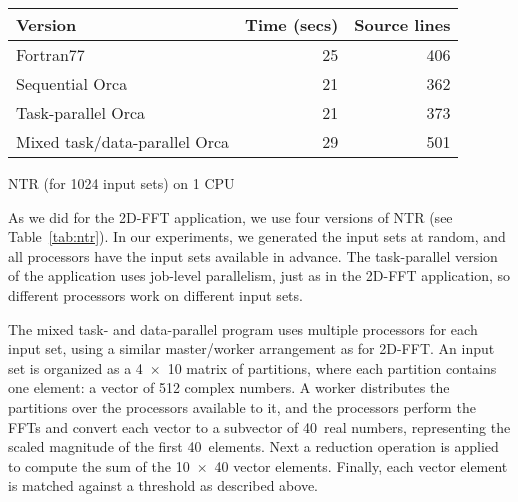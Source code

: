 \documentclass{acmtrans2e}
\begin{document}

\begin{acmtable}{10cm}
\centering
\begin{tabular*}{10cm}{@{\extracolsep\fill}l|r r}
{\bf Version} & {\bf Time (secs)} & {\bf Source lines} \\
\hline
Fortran77 & 25 & 406 \\
Sequential Orca & 21 & 362 \\
Task-parallel Orca & 21 & 373 \\
Mixed task/data-parallel Orca & 29 & 501 \\
\end{tabular*}
\caption{NTR (for 1024 input sets) on 1 CPU}
\label{tab:ntr}
\end{acmtable}

As we did for the 2D-FFT application, we use four versions of NTR (see
Table~\ref{tab:ntr}).
In our experiments, we generated the input sets at random, and
all processors have the input sets available in advance.
The task-parallel version of the application uses job-level parallelism,
just as in the 2D-FFT application, so different processors work
on different input sets.


The mixed task- and data-parallel program uses multiple processors for each input
set, using a similar master/worker arrangement as for 2D-FFT.
An input set is organized as a 4~$\times$~10 matrix of partitions, where each
partition contains one element: a vector of 512 complex numbers.
A worker distributes the partitions over the processors available to it, and
the processors perform the FFTs and convert
each vector to a subvector of 40~real numbers,
representing the scaled magnitude of the first 40~elements.
Next a reduction operation is applied to compute the sum of the
10~$\times$~40 vector elements.
Finally, each vector element is matched against a threshold as described
above.
\end{document}
